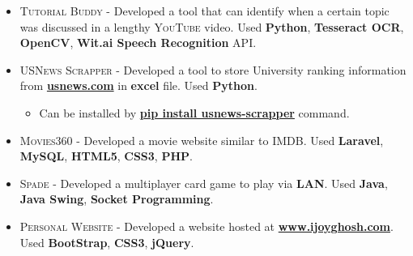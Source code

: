 \documentclass[a4paper,10pt]{article}
\begin{document}
\begin{itemize}
    \item \textsc{Tutorial Buddy} - 
        Developed a tool that can identify when a certain topic was discussed in a lengthy \textsc{YouTube} video. 
        Used \textbf{Python}, \textbf{Tesseract OCR}, \textbf{OpenCV}, \textbf{Wit.ai Speech Recognition} API.
    
    \item \textsc{USNews Scrapper} - 
        Developed a tool to store University ranking information from \href{https://www.usnews.com/best-graduate-schools}{\textbf{usnews.com}} in \textbf{excel} file. 
        Used \textbf{Python}.
    \begin{itemize}
        \item 
        Can be installed by \href{https://github.com/OvroAbir/USNews-Scrapper}{{\normalsize\textbf{pip install usnews-scrapper}}} command.
    \end{itemize}
    
    \item \textsc{Movies360} - 
        Developed a movie website similar to \textsc{IMDB}.
        Used \textbf{Laravel}, \textbf{MySQL}, \textbf{HTML5}, \textbf{CSS3}, \textbf{PHP}.
    
    \item \textsc{Spade} - 
        Developed a multiplayer card game to play via \textbf{LAN}.
        Used \textbf{Java}, \textbf{Java Swing}, \textbf{Socket Programming}.
    
    \item \textsc{Personal Website} - 
        Developed a website hosted at \href{http://www.ijoyghosh.com}{\textbf{www.ijoyghosh.com}}.
        Used \textbf{BootStrap}, \textbf{CSS3}, \textbf{jQuery}.
    

\end{itemize}
\end{document}
